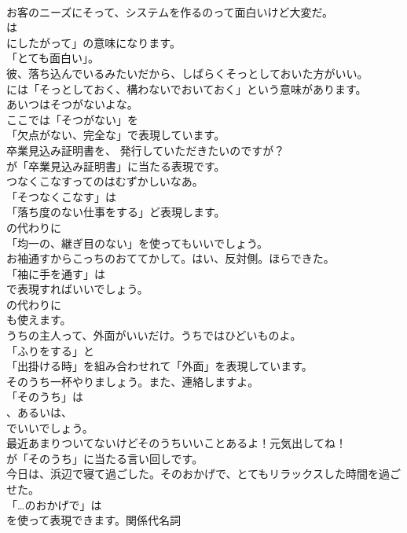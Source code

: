 \documentclass[8pt]{extreport}
\begin{document}
\begin{CJK}{UTF8}{min}
\\	お客のニーズにそって、システムを作るのって面白いけど大変だ。 
\\	は
\\	にしたがって」の意味になります。
\\	「とても面白い」。	
\\	彼、落ち込んでいるみたいだから、しばらくそっとしておいた方がいい。 
\\	には「そっとしておく、構わないでおいておく」という意味があります。	
\\	あいつはそつがないよな。 
\\	ここでは「そつがない」を
\\	「欠点がない、完全な」で表現しています。	
\\	卒業見込み証明書を、 発行していただきたいのですが？ 
\\	が「卒業見込み証明書」に当たる表現です。	
\\	つなくこなすってのはむずかしいなあ。 
\\	「そつなくこなす」は
\\	「落ち度のない仕事をする」ど表現します。
\\	の代わりに
\\	「均一の、継ぎ目のない」を使ってもいいでしょう。	
\\	お袖通すからこっちのおててかして。はい、反対側。ほらできた。 
\\	「袖に手を通す」は 
\\	で表現すればいいでしょう。
\\	の代わりに 
\\	も使えます。	
\\	うちの主人って、外面がいいだけ。うちではひどいものよ。 
\\	「ふりをする」と 
\\	「出掛ける時」を組み合わせれて「外面」を表現しています。	
\\	そのうち一杯やりましょう。また、連絡しますよ。 
\\	「そのうち」は
\\	、あるいは、
\\	でいいでしょう。	
\\	最近あまりついてないけどそのうちいいことあるよ！元気出してね！ 
\\	が「そのうち」に当たる言い回しです。	
\\	今日は、浜辺で寝て過ごした。そのおかげで、とてもリラックスした時間を過ごせた。 
\\	「…のおかげで」は 
\\	を使って表現できます。関係代名詞 

\end{CJK}
\end{document}
